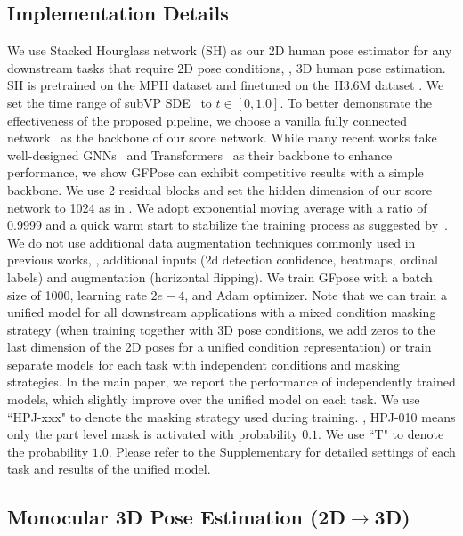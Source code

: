 \documentclass[10pt,twocolumn,letterpaper]{article}
\begin{document}
\subsection{Implementation Details}
\label{subsec:impl_details}
We use Stacked Hourglass network (SH) \cite{newell2016stacked} as our 2D human pose estimator for any downstream tasks that require 2D pose conditions, \eg, 3D human pose estimation. SH is pretrained on the MPII dataset \cite{andriluka20142d} and finetuned on the H3.6M dataset \cite{h36m_pami}. 
We set the time range of subVP SDE~\cite{song2020score} to $t \in [0, 1.0]$. 
To better demonstrate the effectiveness of the proposed pipeline, we choose a vanilla fully connected network~\cite{martinez_2017_3dbaseline} as the backbone of our score network. While many recent works take well-designed GNNs~\cite{lcn-pami,zeng2021learning} and Transformers~\cite{li2022mhformer,zheng20213d} as their backbone to enhance performance, we show GFPose can exhibit competitive results with a simple backbone. 
We use 2 residual blocks and set the hidden dimension of our score network to 1024 as in \cite{martinez_2017_3dbaseline}. 
We adopt exponential moving average with a ratio of 0.9999 and a quick warm start to stabilize the training process as suggested by~\cite{song2019generative}. 
We do not use additional data augmentation techniques commonly used in previous works, \eg, additional inputs (2d detection confidence, heatmaps, ordinal labels) and augmentation (horizontal flipping). We train GFpose with a batch size of 1000, learning rate $2e-4$, and Adam optimizer\cite{kingma2014adam}. 
Note that we can train a unified model for all downstream applications with a mixed condition masking strategy (when training together with 3D pose conditions, we add zeros to the last dimension of the 2D poses for a unified condition representation) or train separate models for each task with independent conditions and masking strategies. 
In the main paper, we report the performance of independently trained models, which slightly improve over the unified model on each task. We use ``HPJ-xxx" to denote the masking strategy used during training. \Eg, HPJ-010 means only the part level mask is activated with probability $0.1$. We use ``T" to denote the probability $1.0$. Please refer to the Supplementary for detailed settings of each task and results of the unified model.




\subsection{Monocular 3D Pose Estimation (2D$\rightarrow$3D)}
\end{document}
